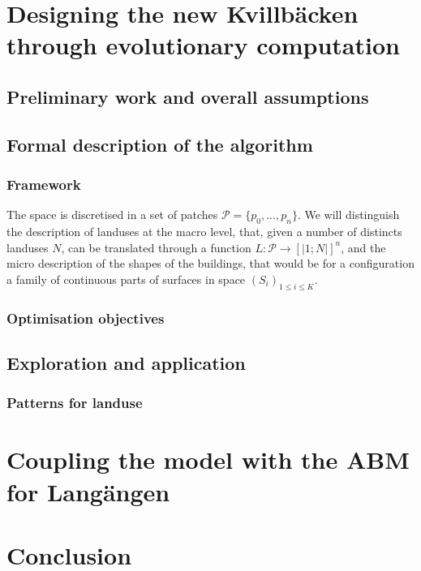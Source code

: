 \documentclass[english]{article}
\begin{document}
\section{Designing the new Kvillbäcken through evolutionary computation}


\subsection{Preliminary work and overall assumptions}


\subsection{Formal description of the algorithm}


\subsubsection{Framework}

The space is discretised in a set of patches $\mathcal{P}=\{p_{0},...,p_{n}\}$.
We will distinguish the description of landuses at the macro level,
that, given a number of distincts landuses $N$, can be translated
through a function $L:\mathcal{P}\rightarrow\left[\left|1;N\right|\right]^{n}$,
and the micro description of the shapes of the buildings, that would
be for a configuration a family of continuous parts of surfaces in
space $ $$(S_{i})_{1\leq i\leq K}$.


\subsubsection{Optimisation objectives}


\subsection{Exploration and application}


\subsubsection{Patterns for landuse}


\section{Coupling the model with the ABM for Langängen}


\section*{Conclusion}

\newpage{}



\end{document}
